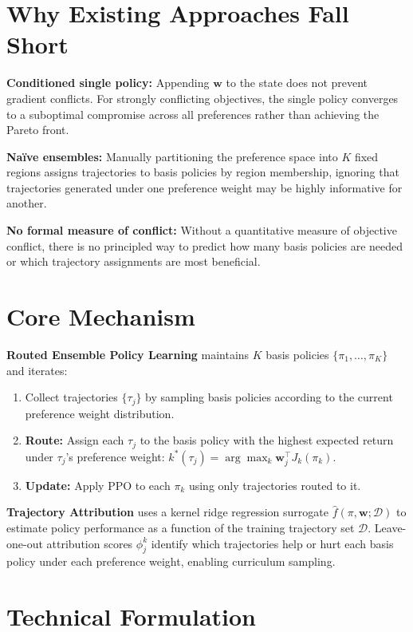 \documentclass[10pt,twocolumn]{article}
\begin{document}
\section{Why Existing Approaches Fall Short}

\textbf{Conditioned single policy:}
Appending $\mathbf{w}$ to the state does not prevent gradient conflicts.
For strongly conflicting objectives, the single policy converges to a
suboptimal compromise across all preferences rather than achieving the
Pareto front.

\textbf{Na\"ive ensembles:}
Manually partitioning the preference space into $K$ fixed regions assigns
trajectories to basis policies by region membership, ignoring that
trajectories generated under one preference weight may be highly
informative for another.

\textbf{No formal measure of conflict:}
Without a quantitative measure of objective conflict, there is no
principled way to predict how many basis policies are needed or which
trajectory assignments are most beneficial.

\section{Core Mechanism}

\textbf{Routed Ensemble Policy Learning} maintains $K$ basis policies
$\{\pi_1, \ldots, \pi_K\}$ and iterates:
\begin{enumerate}[itemsep=2pt,parsep=0pt]
  \item Collect trajectories $\{\tau_j\}$ by sampling basis policies
    according to the current preference weight distribution.
  \item \textbf{Route:} Assign each $\tau_j$ to the basis policy with
    the highest expected return under $\tau_j$'s preference weight:
    $k^*(\tau_j) = \arg\max_k \mathbf{w}_j^\top J_k(\pi_k)$.
  \item \textbf{Update:} Apply PPO to each $\pi_k$ using only
    trajectories routed to it.
\end{enumerate}

\textbf{Trajectory Attribution} uses a kernel ridge regression surrogate
$\hat{f}(\pi, \mathbf{w}; \mathcal{D})$ to estimate policy performance
as a function of the training trajectory set $\mathcal{D}$.
Leave-one-out attribution scores $\phi_j^k$ identify which trajectories
help or hurt each basis policy under each preference weight, enabling
curriculum sampling.

\section{Technical Formulation}
\end{document}
